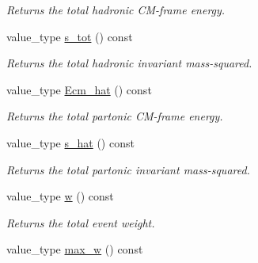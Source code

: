 \begin{DoxyCompactItemize}
\begin{DoxyCompactList}\small\item\em Returns the total hadronic C\-M-\/frame energy. \end{DoxyCompactList}\item 
\hypertarget{a00210_a2a483bce8138485806cf5ef7d8d9ab44}{value\-\_\-type \hyperlink{a00210_a2a483bce8138485806cf5ef7d8d9ab44}{s\-\_\-tot} () const }\label{a00210_a2a483bce8138485806cf5ef7d8d9ab44}

\begin{DoxyCompactList}\small\item\em Returns the total hadronic invariant mass-\/squared. \end{DoxyCompactList}\item 
\hypertarget{a00210_acd66edc648589315d436008b7544148f}{value\-\_\-type \hyperlink{a00210_acd66edc648589315d436008b7544148f}{Ecm\-\_\-hat} () const }\label{a00210_acd66edc648589315d436008b7544148f}

\begin{DoxyCompactList}\small\item\em Returns the total partonic C\-M-\/frame energy. \end{DoxyCompactList}\item 
\hypertarget{a00210_a780da5b3f638f3ab714ef2ee77224dbf}{value\-\_\-type \hyperlink{a00210_a780da5b3f638f3ab714ef2ee77224dbf}{s\-\_\-hat} () const }\label{a00210_a780da5b3f638f3ab714ef2ee77224dbf}

\begin{DoxyCompactList}\small\item\em Returns the total partonic invariant mass-\/squared. \end{DoxyCompactList}\item 
\hypertarget{a00210_a639c007c5544b462c28c46c0fc5e0694}{value\-\_\-type \hyperlink{a00210_a639c007c5544b462c28c46c0fc5e0694}{w} () const }\label{a00210_a639c007c5544b462c28c46c0fc5e0694}

\begin{DoxyCompactList}\small\item\em Returns the total event weight. \end{DoxyCompactList}\item 
\hypertarget{a00210_a95492c5d162bfda7859f161110692d08}{value\-\_\-type \hyperlink{a00210_a95492c5d162bfda7859f161110692d08}{max\-\_\-w} () const }\label{a00210_a95492c5d162bfda7859f161110692d08}


\end{DoxyCompactItemize}

